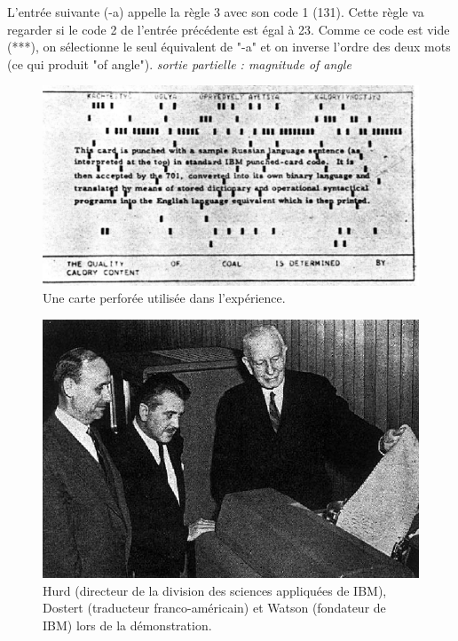 \documentclass[11pt, a4paper]{report}
\begin{document}
L'entrée suivante (-a) appelle la règle 3 avec son code 1 (131). Cette règle va regarder si le 
code 2 de l'entrée précédente est égal à 23. Comme ce code est vide (***), on sélectionne le seul 
équivalent de "-a" et on inverse l'ordre des deux mots (ce qui produit "of angle"). \newline
\textit{sortie partielle : magnitude of angle}

\begin{figure}[t]
  \centering
  \includegraphics[width=1\textwidth]{punched-card.png}
  \caption{Une carte perforée utilisée dans l'expérience.}
  \label{fig:carte-perforee}
\end{figure}

\begin{figure}[t]
  \centering
  \includegraphics[width=1\textwidth]{georgetown-chercheurs.png}
  \caption{Hurd (directeur de la division des sciences appliquées de IBM), Dostert (traducteur franco-américain) et Watson (fondateur de IBM) lors de la démonstration.}
  \label{fig:carte-perforee}
\end{figure}
\end{document}
